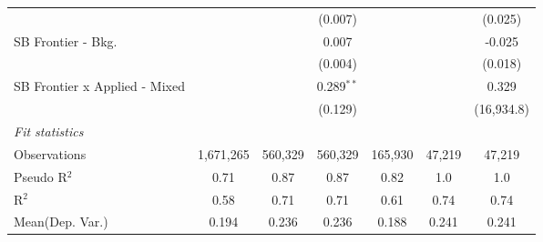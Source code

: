 \begin{tabular}{lcccccc}
                                 &                &                & (0.007)        &                &                & (0.025)\\   
   SB Frontier - Bkg.            &                &                & 0.007          &                &                & -0.025\\   
                                 &                &                & (0.004)        &                &                & (0.018)\\   
   SB Frontier x Applied - Mixed &                &                & 0.289$^{**}$   &                &                & 0.329\\   
                                 &                &                & (0.129)        &                &                & (16,934.8)\\   
   \midrule
   \emph{Fit statistics}\\
   Observations                  & 1,671,265      & 560,329        & 560,329        & 165,930        & 47,219         & 47,219\\  
   Pseudo R$^2$                  & 0.71           & 0.87           & 0.87           & 0.82           & 1.0            & 1.0\\  
   R$^2$                         & 0.58           & 0.71           & 0.71           & 0.61           & 0.74           & 0.74\\  
Mean(Dep. Var.) & 0.194 & 0.236 & 0.236 & 0.188 & 0.241 & 0.241 \\
   

\end{tabular}
